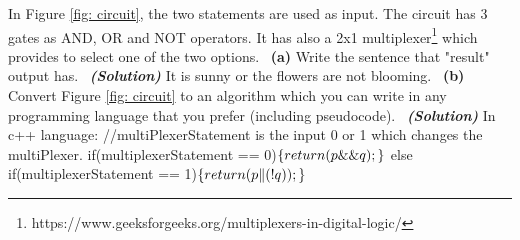 \documentclass[a4 paper]{article}
\numberwithin{equation}{section}
\newcommand{\subproblem}[1]{~\newline\textbf{(#1)}}
\newcommand{\solution}{~\newline\textbf{\textit{(Solution)}} }
\newcommand{\0}{\mathbf{0}}
\begin{document}
In Figure \ref{fig: circuit}, the two statements are used as input. The circuit has 3 gates as AND, OR and NOT operators. It has also a 2x1 multiplexer\footnote{https://www.geeksforgeeks.org/multiplexers-in-digital-logic/} which provides to select one of the two options. 
\subproblem{a} Write the sentence that "result" output has.
\solution It is sunny or the flowers are not blooming.
\newline
\subproblem{b} Convert Figure \ref{fig: circuit} to an algorithm which you can write in any programming language that you prefer (including pseudocode).
\solution
In c++ language:\newline\newline
//multiPlexerStatement is the input 0 or 1 which changes the multiPlexer.\newline
if(multiplexerStatement == 0)$\{\newline
    return (p \&\& q);\newline
\}$\newline
else if(multiplexerStatement == 1)$\{\newline
    return(p \| (!q));\newline
\}$\newline
\end{document}
